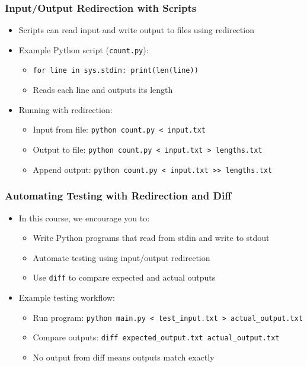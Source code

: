 \documentclass[10pt]{beamer}
\begin{document}
\begin{frame}[fragile]
    \frametitle{Input/Output Redirection with Scripts}
    \begin{itemize}
        \item Scripts can read input and write output to files using redirection
        \item Example Python script (\texttt{count.py}):
        \begin{itemize}
            \item \colorbox{gray!20}{\texttt{for line in sys.stdin: print(len(line))}}
            \item Reads each line and outputs its length
        \end{itemize}
        \item Running with redirection:
        \begin{itemize}
            \item Input from file: \colorbox{gray!20}{\texttt{python count.py < input.txt}}
            \item Output to file: \colorbox{gray!20}{\texttt{python count.py < input.txt > lengths.txt}}
            \item Append output: \colorbox{gray!20}{\texttt{python count.py < input.txt >> lengths.txt}}
        \end{itemize}
    \end{itemize}
\end{frame}

\begin{frame}[fragile]
    \frametitle{Automating Testing with Redirection and Diff}
    \begin{itemize}
        \item In this course, we encourage you to:
        \begin{itemize}
            \item Write Python programs that read from stdin and write to stdout
            \item Automate testing using input/output redirection
            \item Use \texttt{diff} to compare expected and actual outputs
        \end{itemize}
        \item Example testing workflow:
        \begin{itemize}
            \item Run program: \colorbox{gray!20}{\texttt{python main.py < test\_input.txt > actual\_output.txt}}
            \item Compare outputs: \colorbox{gray!20}{\texttt{diff expected\_output.txt actual\_output.txt}}
            \item No output from diff means outputs match exactly
        \end{itemize}
    \end{itemize}
\end{frame}
\end{document}
